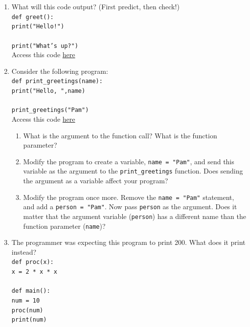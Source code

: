 \documentclass{article}
\begin{document}
\begin{enumerate}
	\item What will this code output? (First predict, then check!)\\
	\texttt{def greet():}\\
	\null\quad\texttt{print("Hello!")}\\
	\texttt{}\\
	\texttt{print("What's up?")}\\
		Access this code \href{https://drive.google.com/file/d/1E3bcdBPJzZ3XdDHAZoqRmL6b_PFArfmh/view?usp=sharing}{here}
	\item Consider the following program:\\
	\texttt{def print\_greetings(name):}\\
	\null\quad\texttt{print("Hello, ",name)}\\
	\texttt{}\\
	\texttt{print\_greetings("Pam")}\\
	Access this code \href{https://drive.google.com/file/d/1datgwaYyWWi5tQ8OYvKllhb2piJZYZbX/view?usp=sharing}{here}
	\begin{enumerate}
		\item What is the argument to the function call? What is the function parameter?
		\item Modify the program to create a variable, \texttt{name = "Pam"}, and send this variable as the argument to the \texttt{print\_greetings} function. Does sending the argument as a variable affect your program?
		\item Modify the program once more. Remove the \texttt{name = "Pam"} statement, and add a \texttt{person = "Pam"}. Now pass \texttt{person} as the argument. Does it matter that the argument variable (\texttt{person}) has a different name than the function parameter (\texttt{name})?
	\end{enumerate}
	\item The programmer was expecting this program to print 200. What does it print instead?\\\texttt{def proc(x):}\\
	\null\quad\texttt{x = 2 * x * x}\\
	\texttt{}\\
	\texttt{def main():}\\
	\null\quad\texttt{num = 10}\\
	\null\quad\texttt{proc(num)}\\
	\null\quad\texttt{print(num)}\\
	\texttt{}\\

\end{enumerate}
\end{document}
